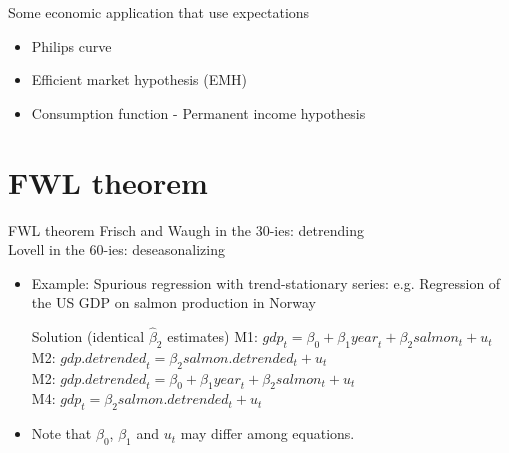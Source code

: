 \documentclass{beamer}
\begin{document}
\begin{frame}{Some economic application that use expectations}
\begin{itemize}
\item Philips curve
\item Efficient market hypothesis (EMH)
\item Consumption function - Permanent income hypothesis
\end{itemize}
\end{frame}


\section{FWL theorem}
\begin{frame}{FWL theorem}
Frisch and Waugh in the 30-ies: detrending \\
Lovell in the 60-ies: deseasonalizing
\begin{itemize}
\item Example: Spurious regression with trend-stationary series: e.g. Regression of the US GDP on salmon production in Norway
\begin{block}{Solution (identical $\hat{\beta}_2$ estimates) }
M1: $\textit{gdp}_t = \beta_0 + \beta_1 \textit{year}_t + \beta_2 \textit{salmon}_t + u_t$\\
M2: $\textit{gdp.detrended}_t = \beta_2 \textit{salmon.detrended}_t + u_t$\\
M2: $\textit{gdp.detrended}_t = \beta_0 + \beta_1 \textit{year}_t + \beta_2 \textit{salmon}_t + u_t$\\
M4: $\textit{gdp}_t = \beta_2 \textit{salmon.detrended}_t + u_t$
\end{block}
\item Note that $\beta_0$, $\beta_1$ and $u_t$ may differ among equations.
\end{itemize}
\end{frame}

\end{document}
